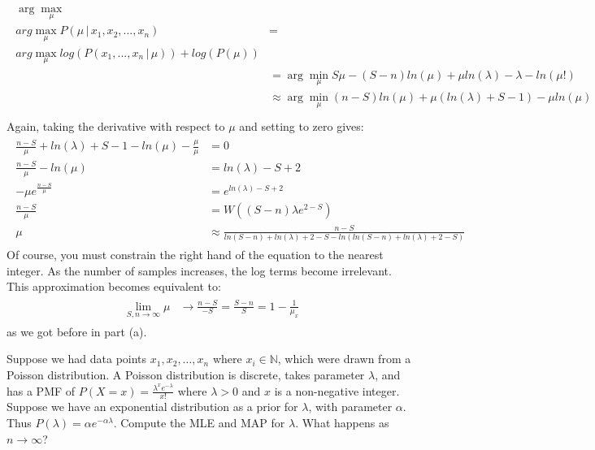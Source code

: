 \begin{Parts}
\begin{solution}
    \begin{align*}
        \begin{aligned}
            \arg\max_\mu \\arg\max_\mu P(\mu\,|\,x_1, x_2, ..., x_n) &= \\arg\max_\mu log(P(x_1, ..., x_n\,|\,\mu))+log(P(\mu))\\
            &=\arg\min_\mu S\mu - (S-n)ln(\mu) + \mu ln(\lambda) - \lambda - ln(\mu!)\\
            &\approx \arg\min_\mu (n-S)ln(\mu)+\mu(ln(\lambda)+S-1)-\mu ln(\mu)\\
        \end{aligned}
    \end{align*}
    Again, taking the derivative with respect to $\mu$ and setting to zero gives:
    \begin{align*}
        \begin{aligned}
            \frac{n-S}{\mu}+ln(\lambda)+S-1-ln(\mu)-\frac{\mu}{\mu} &=0\\
            \frac{n-S}{\mu}-ln(\mu) &= ln(\lambda)-S+2\\
            -\mu e^\frac{n-S}{\mu} &= e^{ln(\lambda)-S+2}\\
            \frac{n-S}{\mu} &= W((S-n)\lambda e^{2-S})\\
            \mu &\approx \frac{n-S}{ln(S-n)+ln(\lambda)+2-S-ln(ln(S-n)+ln(\lambda)+2-S)}
        \end{aligned}
    \end{align*}
    Of course, you must constrain the right hand of the equation to the nearest integer. As the number of samples increases, the log terms become irrelevant. This approximation becomes equivalent to:
    \begin{align*}
        \begin{aligned}
            \lim_{S,n\to \infty}\mu &\to \frac{n-S}{-S} = \frac{S-n}{S}=1-\frac{1}{\mu_x}
        \end{aligned}
    \end{align*}
    as we got before in part (a).
\end{solution}
\fi

\Part
    Suppose we had data points $x_1, x_2, \dots, x_n$ where $x_i \in \mathbb{N}$, which were drawn from a Poisson distribution. A Poisson distribution is discrete, takes parameter $\lambda$, and has a PMF of $P(X=x)=\frac{\lambda^x e^{-\lambda}}{x!}$ where $\lambda > 0$ and $x$ is a non-negative integer.
    Suppose we have an exponential distribution as a prior for $\lambda$, with parameter $\alpha$. Thus $P(\lambda) = \alpha e^{-\alpha \lambda}$. Compute the MLE and MAP for $\lambda$. What happens as $n \to \infty$?


\end{Parts}
